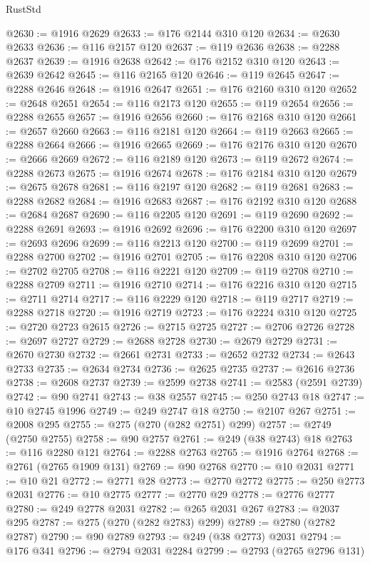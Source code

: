 \begin{lexlean}{RustStd}
\begin{coremodule}
@2630 := @1916 @2629
@2633 := @176 @2144 @310 @120
@2634 := @2630 @2633
@2636 := @116 @2157 @120
@2637 := @119 @2636
@2638 := @2288 @2637
@2639 := @1916 @2638
@2642 := @176 @2152 @310 @120
@2643 := @2639 @2642
@2645 := @116 @2165 @120
@2646 := @119 @2645
@2647 := @2288 @2646
@2648 := @1916 @2647
@2651 := @176 @2160 @310 @120
@2652 := @2648 @2651
@2654 := @116 @2173 @120
@2655 := @119 @2654
@2656 := @2288 @2655
@2657 := @1916 @2656
@2660 := @176 @2168 @310 @120
@2661 := @2657 @2660
@2663 := @116 @2181 @120
@2664 := @119 @2663
@2665 := @2288 @2664
@2666 := @1916 @2665
@2669 := @176 @2176 @310 @120
@2670 := @2666 @2669
@2672 := @116 @2189 @120
@2673 := @119 @2672
@2674 := @2288 @2673
@2675 := @1916 @2674
@2678 := @176 @2184 @310 @120
@2679 := @2675 @2678
@2681 := @116 @2197 @120
@2682 := @119 @2681
@2683 := @2288 @2682
@2684 := @1916 @2683
@2687 := @176 @2192 @310 @120
@2688 := @2684 @2687
@2690 := @116 @2205 @120
@2691 := @119 @2690
@2692 := @2288 @2691
@2693 := @1916 @2692
@2696 := @176 @2200 @310 @120
@2697 := @2693 @2696
@2699 := @116 @2213 @120
@2700 := @119 @2699
@2701 := @2288 @2700
@2702 := @1916 @2701
@2705 := @176 @2208 @310 @120
@2706 := @2702 @2705
@2708 := @116 @2221 @120
@2709 := @119 @2708
@2710 := @2288 @2709
@2711 := @1916 @2710
@2714 := @176 @2216 @310 @120
@2715 := @2711 @2714
@2717 := @116 @2229 @120
@2718 := @119 @2717
@2719 := @2288 @2718
@2720 := @1916 @2719
@2723 := @176 @2224 @310 @120
@2725 := @2720 @2723 @2615
@2726 := @2715 @2725
@2727 := @2706 @2726
@2728 := @2697 @2727
@2729 := @2688 @2728
@2730 := @2679 @2729
@2731 := @2670 @2730
@2732 := @2661 @2731
@2733 := @2652 @2732
@2734 := @2643 @2733
@2735 := @2634 @2734
@2736 := @2625 @2735
@2737 := @2616 @2736
@2738 := @2608 @2737
@2739 := @2599 @2738
@2741 := @2583 (@2591 @2739)
@2742 := @90 @2741
@2743 := @38 @2557
@2745 := @250 @2743 @18
@2747 := @10 @2745 @1996
@2749 := @249 @2747 @18
@2750 := @2107 @267
@2751 := @2008 @295
@2755 := @275 (@270 (@282 @2751) @299)
@2757 := @2749 (@2750 @2755)
@2758 := @90 @2757
@2761 := @249 (@38 @2743) @18
@2763 := @116 @2280 @121
@2764 := @2288 @2763
@2765 := @1916 @2764
@2768 := @2761 (@2765 @1909 @131)
@2769 := @90 @2768
@2770 := @10 @2031
@2771 := @10 @21
@2772 := @2771 @28
@2773 := @2770 @2772
@2775 := @250 @2773 @2031
@2776 := @10 @2775
@2777 := @2770 @29
@2778 := @2776 @2777
@2780 := @249 @2778 @2031
@2782 := @265 @2031 @267
@2783 := @2037 @295
@2787 := @275 (@270 (@282 @2783) @299)
@2789 := @2780 (@2782 @2787)
@2790 := @90 @2789
@2793 := @249 (@38 @2773) @2031
@2794 := @176 @341
@2796 := @2794 @2031 @2284
@2799 := @2793 (@2765 @2796 @131)

\end{coremodule}
\end{lexlean}
